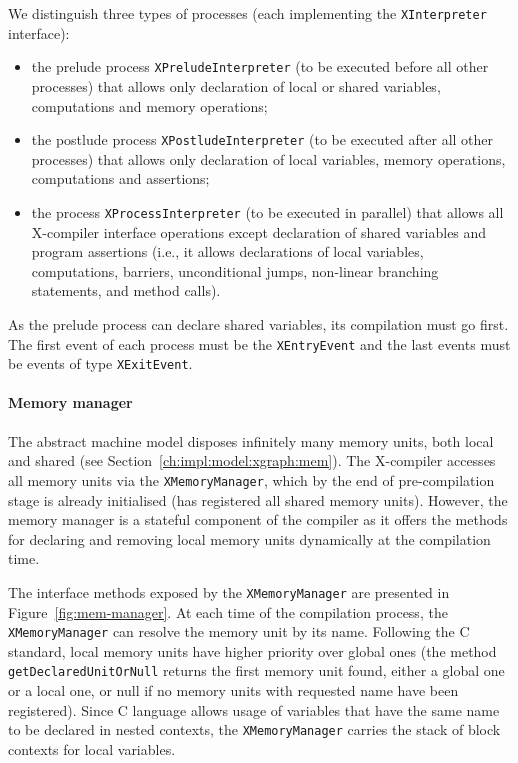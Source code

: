 We distinguish three types of processes (each implementing the \texttt{XInterpreter} interface):
\begin{itemize}[noitemsep,topsep=0pt]
\item the prelude process \texttt{XPreludeInterpreter} (to be executed before all other processes) that allows only declaration of local or shared variables, computations and memory operations;
\item the postlude process \texttt{XPostludeInterpreter} (to be executed after all other processes) that allows only declaration of local variables, memory operations, computations and assertions;
\item the process \texttt{XProcessInterpreter} (to be executed in parallel) that allows all X-compiler interface operations except declaration of shared variables %
and program assertions (i.e., it allows declarations of local variables, computations, barriers, unconditional jumps, non-linear branching statements, and method calls).
\end{itemize}

As the prelude process can declare shared variables, its compilation must go first.
The first event of each process must be the \texttt{XEntryEvent} and the last events must be events of type \texttt{XExitEvent}.


\paragraph{Memory manager}
\label{ch:impl:proc:x-compiler:mem}

The \xgraph{} abstract machine model disposes infinitely many memory units, both local and shared (see Section~\ref{ch:impl:model:xgraph:mem}).
The X-compiler accesses all memory units via the \texttt{XMemoryManager}, which by the end of pre-compilation stage is already initialised (has registered all shared memory units).
However, the memory manager is a stateful component of the compiler as it offers the methods for declaring and removing local memory units dynamically at the compilation time.

The interface methods exposed by the \texttt{XMemoryManager} are presented in Figure~\ref{fig:mem-manager}.
At each time of the compilation process, the \texttt{XMemoryManager} can resolve the memory unit by its name.
Following the C standard, local memory units have higher priority over global ones (the method \texttt{getDeclaredUnitOrNull} returns the first memory unit found, either a global one or a local one, or null if no memory units with requested name have been registered).
Since C language allows usage of variables that have the same name to be declared in nested contexts, the \texttt{XMemoryManager} carries the stack of block contexts for local variables. %

